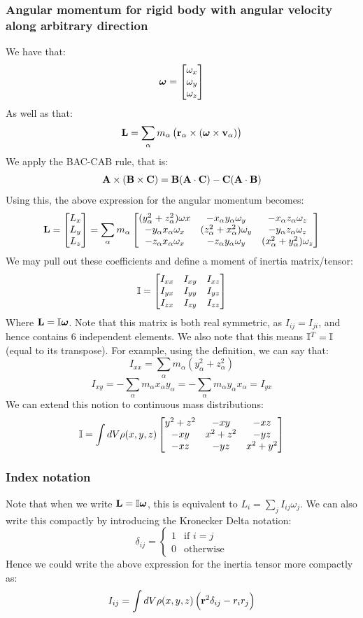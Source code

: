 \subsubsection{Angular momentum for rigid body with angular velocity along arbitrary direction}
We have that:
\[\bm{\omega} = \begin{bmatrix}\omega_x \\ \omega_y \\ \omega_z\end{bmatrix}\]
As well as that:
\[\mathbf{L} = \sum_\alpha m_\alpha \left(\mathbf{r}_\alpha \times (\bm{\omega} \times \mathbf{v}_\alpha)\right)\]
We apply the BAC-CAB rule, that is:
\[\mathbf{A} \times (\mathbf{B} \times \mathbf{C}) = \mathbf{B}(\mathbf{A} \cdot \mathbf{C}) - \mathbf{C}(\mathbf{A} \cdot \mathbf{B})\]
Using this, the above expression for the angular momentum becomes:
\[\mathbf{L} = \begin{bmatrix}L_x \\ L_y \\ L_z\end{bmatrix} = \sum_\alpha m_\alpha \begin{bmatrix}(y_\alpha^2 + z_\alpha^2)\omega x & - x_\alpha y_\alpha \omega_y & -x_\alpha z_\alpha \omega_z
\\ -y_\alpha x_\alpha \omega_x & (z_\alpha^2 + x_\alpha^2)\omega_y & -y_\alpha z_\alpha \omega_z
\\ -z_\alpha x_\alpha \omega_x & -z_\alpha y_\alpha \omega_y & (x_\alpha^2 + y_\alpha^2)\omega_z\end{bmatrix}\]
We may pull out these coefficients and define a moment of inertia matrix/tensor:
\[\mathbb{I} = \begin{bmatrix}I_{xx} & I_{xy} & I_{xz} \\ I_{yx} & I_{yy} & I_{yz} \\ I_{zx} & I_{zy} & I_{zz}\end{bmatrix}\]
Where $\mathbf{L} = \mathbb{I}\bm{\omega}$. Note that this matrix is both real symmetric, as $I_{ij} = I_{ji}$, and hence contains 6 independent elements. We also note that this means $\mathbb{I}^T = \mathbb{I}$ (equal to its transpose). For example, using the definition, we can say that:
\[I_{xx} = \sum_\alpha m_\alpha(y_\alpha^2 + z_\alpha^2)\]
\[I_{xy} = -\sum_\alpha m_\alpha x_\alpha y_\alpha = -\sum_\alpha m_\alpha y_\alpha x_\alpha = I_{yx}\]
We can extend this notion to continuous mass distributions:
\[\mathbb{I} = \int dV\rho(x, y, z)\begin{bmatrix}y^2 + z^2 & -xy & -xz \\ -xy & x^2 + z^2 & -yz \\ -xz & -yz & x^2 + y^2
\end{bmatrix}\]
\subsubsection{Index notation}
Note that when we write $\mathbf{L} = \mathbb{I}\bm{\omega}$, this is equivalent to $L_i = \sum_j I_{ij}\omega_j$. We can also write this compactly by introducing the Kronecker Delta notation:
\[\delta_{ij} = \begin{cases}
1 & \text{if $i = j$}
\\ 0 & \text{otherwise}
\end{cases}\]
Hence we could write the above expression for the inertia tensor more compactly as:
\[I_{ij} = \int dV\rho(x,y,z)\left(\mathbf{r}^2\delta_{ij} - r_ir_j\right)\]


